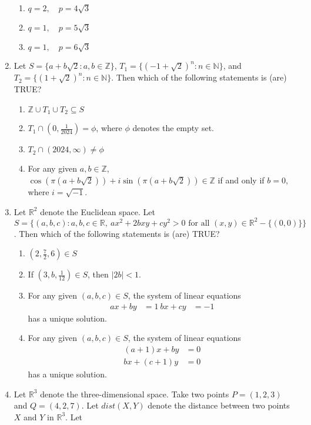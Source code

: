 \documentclass[12pt,a4paper]{article}
\begin{document}
\begin{enumerate}
\begin{enumerate}
        \item \( q = 2, \quad p = 4\sqrt{3} \)
        \item \( q = 1, \quad p = 5\sqrt{3} \)
        \item \( q = 1, \quad p = 6\sqrt{3} \)
    \end{enumerate}
\item Let $ S= \{ a + b\sqrt{2} : a, b \in \mathbb{Z} \}$, $ T_1= \{ (-1 + \sqrt{2})^n : n \in \mathbb{N} \}$, and $ T_2= \{ (1 + \sqrt{2})^n : n \in \mathbb{N} \}$. Then which of the following statements is (are) TRUE?
    \begin{enumerate}
        \item $ \mathbb{Z} \cup T_1 \cup T_2 \subseteq S $
        \item $ T_1 \cap \left( 0, \frac{1}{2024} \right) = \phi $, where $ \phi $ denotes the empty set.
        \item $ T_2 \cap (2024, \infty) \neq \phi $
        \item For any given $ a, b \in \mathbb{Z} $, $ \cos \left( \pi (a + b\sqrt{2}) \right) + i \sin \left( \pi (a + b\sqrt{2}) \right) \in \mathbb{Z} $ if and only if $ b = 0 $, where $ i = \sqrt{-1} $.
    \end{enumerate}

\item Let $ \mathbb{R}^2 $ denote the Euclidean space. Let 
    $ S = \{ (a, b, c) : a, b, c \in \mathbb{R}, \ ax^2 + 2bxy + cy^2 > 0 \text{ for all } (x, y) \in \mathbb{R}^2 - \{(0,0)\} \} $. Then which of the following statements is (are) TRUE?
    \begin{enumerate}
        \item $ \left( 2, \frac{7}{2}, 6 \right) \in S $
        \item If $ \left( 3, b, \frac{1}{12} \right) \in S $, then $ |2b| < 1 $.
        \item For any given $ (a, b, c) \in S $, the system of linear equations
        \begin{align*}
        ax + by &= 1 \
        bx + cy &= -1
        \end{align*}
        has a unique solution.
        \item For any given $ (a, b, c) \in S $, the system of linear equations
        \begin{align*}
        (a+1)x + by &= 0 \\
        bx + (c+1)y &= 0
        \end{align*}
        has a unique solution.
    \end{enumerate}
\item Let $\mathbb{R}^3$ denote the three-dimensional space. Take two points $P = (1,2,3)$ and $Q = (4,2,7)$. Let $dist(X,Y)$ denote the distance between two points $X$ and $Y$ in $\mathbb{R}^3$. Let  


\end{enumerate}
\end{document}
